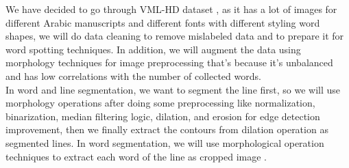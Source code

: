 We have decided to go through VML-HD dataset \cite{VMLHD}, as it has a lot of images for different Arabic manuscripts and different fonts with different styling word shapes, we will do data cleaning to remove mislabeled data and to prepare it for word spotting techniques. In addition, we will augment the data using morphology techniques for image preprocessing that's because it's unbalanced and has low correlations with the number of collected words. \\

In word and line segmentation, we want to segment the line first, so we will use morphology operations after doing some preprocessing like normalization, binarization, median filtering logic,  dilation, and erosion for edge detection improvement, then we finally extract the contours from dilation operation as segmented lines. In word segmentation, we will use morphological operation techniques to extract each word of the line as cropped image \cite{PP}.